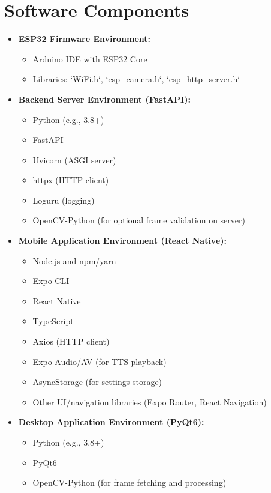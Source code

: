 \documentclass[12pt, a4paper]{report}
\begin{document}
\section{Software Components}
\begin{itemize}
    \item \textbf{ESP32 Firmware Environment:}
        \begin{itemize}
            \item Arduino IDE with ESP32 Core
            \item Libraries: `WiFi.h`, `esp\_camera.h`, `esp\_http\_server.h`
        \end{itemize}
    \item \textbf{Backend Server Environment (FastAPI):}
        \begin{itemize}
            \item Python (e.g., 3.8+)
            \item FastAPI
            \item Uvicorn (ASGI server)
            \item httpx (HTTP client)
            \item Loguru (logging)
            \item OpenCV-Python (for optional frame validation on server)
        \end{itemize}
    \item \textbf{Mobile Application Environment (React Native):}
        \begin{itemize}
            \item Node.js and npm/yarn
            \item Expo CLI
            \item React Native
            \item TypeScript
            \item Axios (HTTP client)
            \item Expo Audio/AV (for TTS playback)
            \item AsyncStorage (for settings storage)
            \item Other UI/navigation libraries (Expo Router, React Navigation)
        \end{itemize}
    \item \textbf{Desktop Application Environment (PyQt6):}
        \begin{itemize}
            \item Python (e.g., 3.8+)
            \item PyQt6
            \item OpenCV-Python (for frame fetching and processing)

\end{itemize}
\end{itemize}
\end{document}
